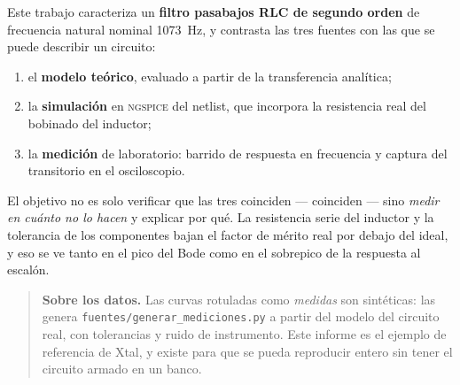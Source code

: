 Este trabajo caracteriza un \textbf{filtro pasabajos RLC de segundo orden} de
frecuencia natural nominal \SI{1073}{\hertz}, y contrasta las tres fuentes con
las que se puede describir un circuito:

\begin{enumerate}[itemsep=2pt, topsep=4pt]
  \item el \textbf{modelo teórico}, evaluado a partir de la transferencia
        analítica;
  \item la \textbf{simulación} en \textsc{ngspice} del netlist, que incorpora la
        resistencia real del bobinado del inductor;
  \item la \textbf{medición} de laboratorio: barrido de respuesta en frecuencia
        y captura del transitorio en el osciloscopio.
\end{enumerate}

El objetivo no es solo verificar que las tres coinciden --- coinciden --- sino
\emph{medir en cuánto no lo hacen} y explicar por qué. La resistencia serie del
inductor y la tolerancia de los componentes bajan el factor de mérito real por
debajo del ideal, y eso se ve tanto en el pico del Bode como en el sobrepico de
la respuesta al escalón.

\begin{quote}\small
\textbf{Sobre los datos.} Las curvas rotuladas como \emph{medidas} son
sintéticas: las genera \texttt{fuentes/generar\_mediciones.py} a partir del
modelo del circuito real, con tolerancias y ruido de instrumento. Este informe
es el ejemplo de referencia de Xtal, y existe para que se pueda reproducir
entero sin tener el circuito armado en un banco.
\end{quote}
